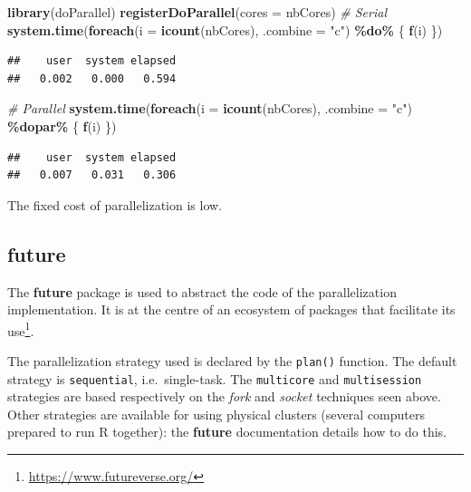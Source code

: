 \documentclass[
  12pt,
  american,
  a4paper,
  extrafontsizes,onecolumn,openright
  ]{memoir}
\newenvironment{Shaded}{\begin{snugshade}}{\end{snugshade}}
\newcommand{\AttributeTok}[1]{\textcolor[rgb]{0.13,0.29,0.53}{#1}}
\newcommand{\CommentTok}[1]{\textcolor[rgb]{0.56,0.35,0.01}{\textit{#1}}}
\newcommand{\FunctionTok}[1]{\textcolor[rgb]{0.13,0.29,0.53}{\textbf{#1}}}
\newcommand{\NormalTok}[1]{#1}
\newcommand{\SpecialCharTok}[1]{\textcolor[rgb]{0.81,0.36,0.00}{\textbf{#1}}}
\newcommand{\StringTok}[1]{\textcolor[rgb]{0.31,0.60,0.02}{#1}}
\begin{document}
\scriptsize

\begin{Shaded}
\begin{Highlighting}[]
\FunctionTok{library}\NormalTok{(doParallel)}
\FunctionTok{registerDoParallel}\NormalTok{(}\AttributeTok{cores =}\NormalTok{ nbCores)}
\CommentTok{\# Serial}
\FunctionTok{system.time}\NormalTok{(}\FunctionTok{foreach}\NormalTok{(}\AttributeTok{i =} \FunctionTok{icount}\NormalTok{(nbCores), }\AttributeTok{.combine =} \StringTok{"c"}\NormalTok{) }\SpecialCharTok{\%do\%}
\NormalTok{    \{}
        \FunctionTok{f}\NormalTok{(i)}
\NormalTok{    \})}
\end{Highlighting}
\end{Shaded}

\begin{verbatim}
##    user  system elapsed 
##   0.002   0.000   0.594
\end{verbatim}

\begin{Shaded}
\begin{Highlighting}[]
\CommentTok{\# Parallel}
\FunctionTok{system.time}\NormalTok{(}\FunctionTok{foreach}\NormalTok{(}\AttributeTok{i =} \FunctionTok{icount}\NormalTok{(nbCores), }\AttributeTok{.combine =} \StringTok{"c"}\NormalTok{) }\SpecialCharTok{\%dopar\%}
\NormalTok{    \{}
        \FunctionTok{f}\NormalTok{(i)}
\NormalTok{    \})}
\end{Highlighting}
\end{Shaded}

\begin{verbatim}
##    user  system elapsed 
##   0.007   0.031   0.306
\end{verbatim}

\normalsize

The fixed cost of parallelization is low.

\subsection{future}\label{future}

The \textbf{future} package is used to abstract the code of the parallelization implementation.
It is at the centre of an ecosystem of packages that facilitate its use\footnote{\url{https://www.futureverse.org/}}.

The parallelization strategy used is declared by the \texttt{plan()} function.
The default strategy is \texttt{sequential}, i.e.~single-task.
The \texttt{multicore} and \texttt{multisession} strategies are based respectively on the \emph{fork} and \emph{socket} techniques seen above.
Other strategies are available for using physical clusters (several computers prepared to run R together): the \textbf{future} documentation details how to do this.
\end{document}
